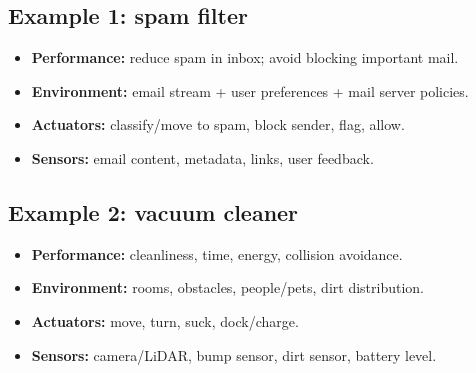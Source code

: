 \documentclass[11pt]{article}
\begin{document}
\subsection{Example 1: spam filter}
\begin{itemize}[leftmargin=*]
  \item \textbf{Performance:} reduce spam in inbox; avoid blocking important mail.
  \item \textbf{Environment:} email stream + user preferences + mail server policies.
  \item \textbf{Actuators:} classify/move to spam, block sender, flag, allow.
  \item \textbf{Sensors:} email content, metadata, links, user feedback.
\end{itemize}

\subsection{Example 2: vacuum cleaner}
\begin{itemize}[leftmargin=*]
  \item \textbf{Performance:} cleanliness, time, energy, collision avoidance.
  \item \textbf{Environment:} rooms, obstacles, people/pets, dirt distribution.
  \item \textbf{Actuators:} move, turn, suck, dock/charge.
  \item \textbf{Sensors:} camera/LiDAR, bump sensor, dirt sensor, battery level.
\end{itemize}
\end{document}
